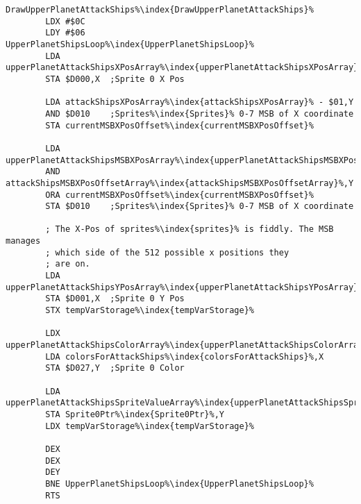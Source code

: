 \begin{minipage}[b]{0.55\linewidth}
\centering
\begin{lstlisting}[basicstyle=\tiny,escapechar=\%]
DrawUpperPlanetAttackShips%\index{DrawUpperPlanetAttackShips}%
        LDX #$0C
        LDY #$06
UpperPlanetShipsLoop%\index{UpperPlanetShipsLoop}%   
        LDA upperPlanetAttackShipsXPosArray%\index{upperPlanetAttackShipsXPosArray}%,Y
        STA $D000,X  ;Sprite 0 X Pos

        LDA attackShipsXPosArray%\index{attackShipsXPosArray}% - $01,Y
        AND $D010    ;Sprites%\index{Sprites}% 0-7 MSB of X coordinate
        STA currentMSBXPosOffset%\index{currentMSBXPosOffset}%

        LDA upperPlanetAttackShipsMSBXPosArray%\index{upperPlanetAttackShipsMSBXPosArray}%,Y
        AND attackShipsMSBXPosOffsetArray%\index{attackShipsMSBXPosOffsetArray}%,Y
        ORA currentMSBXPosOffset%\index{currentMSBXPosOffset}%
        STA $D010    ;Sprites%\index{Sprites}% 0-7 MSB of X coordinate

        ; The X-Pos of sprites%\index{sprites}% is fiddly. The MSB manages
        ; which side of the 512 possible x positions they
        ; are on.
        LDA upperPlanetAttackShipsYPosArray%\index{upperPlanetAttackShipsYPosArray}%,Y
        STA $D001,X  ;Sprite 0 Y Pos
        STX tempVarStorage%\index{tempVarStorage}%

        LDX upperPlanetAttackShipsColorArray%\index{upperPlanetAttackShipsColorArray}%,Y
        LDA colorsForAttackShips%\index{colorsForAttackShips}%,X
        STA $D027,Y  ;Sprite 0 Color

        LDA upperPlanetAttackShipsSpriteValueArray%\index{upperPlanetAttackShipsSpriteValueArray}%,Y
        STA Sprite0Ptr%\index{Sprite0Ptr}%,Y
        LDX tempVarStorage%\index{tempVarStorage}%

        DEX
        DEX
        DEY
        BNE UpperPlanetShipsLoop%\index{UpperPlanetShipsLoop}%
        RTS
\end{lstlisting}
\end{minipage}
\hspace{0.5cm}
